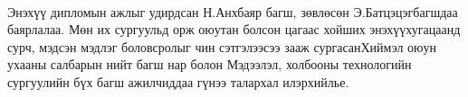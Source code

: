 
\begin{acknowledgements}
\addchaptertocentry{\acknowledgementname}
\paragraph{}Энэхүү дипломын ажлыг удирдсан Н.Анхбаяр багш, зөвлөсөн Э.Батцэцэг\break багшдаа баярлалаа. Мөн их сургуульд орж оюутан болсон цагаас хойших энэхүү\break хугацаанд сурч, мэдсэн мэдлэг боловсролыг чин сэтгэлээсээ зааж сургасан\break Хиймэл оюун ухааны салбарын нийт багш нар болон Мэдээлэл, холбооны технологийн сургуулийн бүх багш ажилчиддаа гүнээ талархал илэрхийлье. 
\end{acknowledgements}

